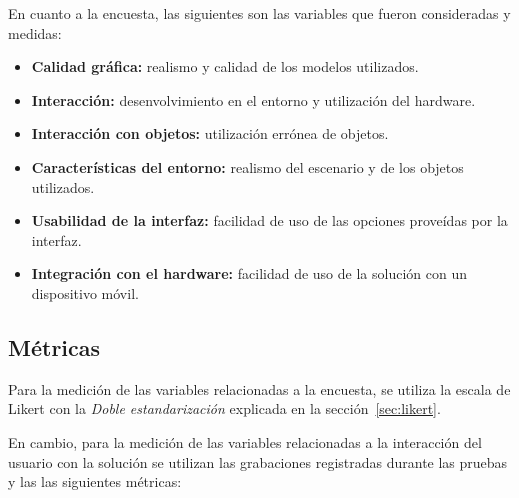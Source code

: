 En cuanto a la encuesta, las siguientes son las variables que fueron consideradas 
y medidas:

\begin{itemize}

\item \textbf{Calidad gráfica:} realismo y calidad de los modelos utilizados.

\item \textbf{Interacción:} desenvolvimiento en el entorno y utilización del 
    hardware.

\item \textbf{Interacción con objetos:} utilización errónea de objetos.

\item \textbf{Características del entorno:} realismo del escenario y de los 
    objetos utilizados.

\item \textbf{Usabilidad de la interfaz:} facilidad de uso de las opciones 
    proveídas por la interfaz.

\item \textbf{Integración con el hardware:} facilidad de uso de la solución con 
    un dispositivo móvil. 

\end{itemize}

\subsection{Métricas}

Para la medición de las variables relacionadas a la encuesta,  se utiliza la escala
de Likert con la \emph{Doble estandarización} explicada en la
sección~\ref{sec:likert}. 

En cambio, para la medición de las variables relacionadas a la interacción del usuario con 
la solución se utilizan las grabaciones registradas durante las pruebas y las
las siguientes métricas:

%

